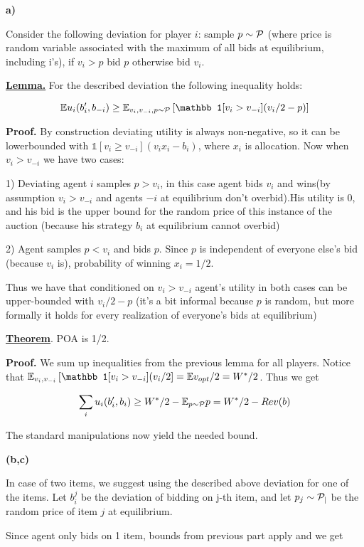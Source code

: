 \textbf{a)} 

Consider the following deviation for player $i$: sample $p\sim \cal P$ (where price is random variable associated with the maximum of all bids at equilibrium, including i's), if $v_i>p$ bid $p$ otherwise bid $v_i$.

\textbf{\uline{Lemma.}} For the described deviation the following inequality holds:

$$
\E u_i(b_i',b_{-i}) \geq \E_{v_i,v_{-i},p \sim \cal P}\left [ \mathbb 1 [v_i>v_{-i}](v_i/2-p) \right]
$$

\textbf{Proof.} By construction deviating utility is always non-negative, so it can be lowerbounded with $\mathbb 1[v_i\geq v_{-i}](v_i x_i-b_i)$, where $x_i$ is allocation. Now when $v_i>v_{-i}$ we have two cases:

1) Deviating agent $i$ samples $p>v_i$, in this case agent bids $v_i$ and wins(by assumption $v_i>v_{-i}$ and agents $-i$ at equilibrium don't overbid).His utility is 0, and his bid is the upper bound for the  random price of this instance of the auction (because his strategy $b_i$ at equilibrium cannot overbid)

2) Agent samples $p<v_i$ and bids $p$. Since $p$ is independent of everyone else's bid (because $v_i$ is), probability of winning $x_i=1/2$.

Thus we have that conditioned on $v_i>v_{-i}$ agent's utility in both cases can be upper-bounded with $v_i/2-p$ (it's a bit informal because $p$ is random, but more formally it holds for every realization of everyone's bids at equilibrium)

\textbf{\uline{Theorem}}. POA is 1/2.

\textbf{Proof.} We sum up inequalities from the previous lemma for all players. Notice that $\E_{v_i,v_{-i}}\left [ \mathbb 1 [v_i>v_{-i}](v_i/2\right] = \E v_{opt}/2=W^*/2$. Thus we get

$$
\sum_i u_i (b_i',b_i) \geq W^*/2 - \mathbb{E}_{p \sim \cal P} p=W^*/2 - Rev(b) 
$$

The standard manipulations now yield the needed bound.

\textbf{(b,c)} 

In case of two items, we suggest using the described above deviation for one of the items. Let $b_i^j$ be the deviation of bidding on j-th item, and let $p_j \sim \cal P_j$ be the random price of item $j$ at equilibrium.

Since agent only bids on 1 item, bounds from previous part apply and we get

